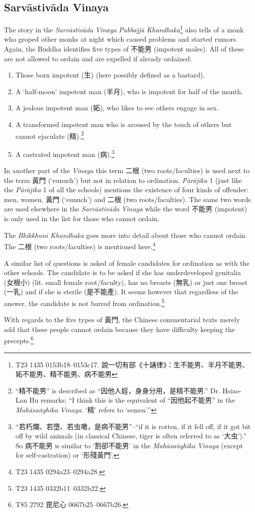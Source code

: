 \subsection{Sarvāstivāda Vinaya}
The story in the \textit{Sarvāstivāda} \textit{Vinaya} \textit{Pabbajjā Khandhaka}\footnote{T23 1435 0153b18–0153c17. 說一切有部《十誦律》：生不能男、半月不能男、妬不能男、精不能男、病不能男} also tells of a monk who groped other monks at night which caused problems and started rumors. Again, the Buddha identifies five types of 不能男 (impotent males). All of these are not allowed to ordain and are expelled if already ordained:

\begin{enumerate}
\item Those born impotent (生) (here possibly defined as a bastard).
\item A `half-moon' impotent man (半月), who is impotent for half of the month.
\item A jealous impotent man (妬), who likes to see others engage in sex.
\item A transformed impotent man who is aroused by the touch of others but cannot ejaculate (精).\footnote{``精不能男'' is described as ``因他人婬，身身分用，是精不能男.'' Dr. Hsiao-Lan Hu remarks: ``I think this is the equivalent of ``因他起不能男'' in the \textit{Mahāsaṅghika} \textit{Vinaya}. `精' refers to `semen'.''}
\item A castrated impotent man (病).\footnote{``若朽爛、若墮、若虫噉，是病不能男''--``if it is rotten, if it fell off, if it got bit off by wild animals (in classical Chinese, tiger is often referred to as `大虫').'' So 病不能男 is similar to `割卻不能男' in the \textit{Mahāsaṅghika} \textit{Vinaya} (except for self-castration) or `形殘黃門'.}
\end{enumerate}

In another part of the \textit{Vinaya} this term 二根 (two roots/faculties) is used next to the term 黃門 (`eunuch') but not in relation to ordination. \textit{Pārājika} 1 (just like the \textit{Pārājika} 1 of all the schools) mentions the existence of four kinds of offender: men, women, 黃門 (`eunuch') and 二根 (two roots/faculties). The same two words are used elsewhere in the \textit{Sarvāstivāda} \textit{Vinaya} while the word 不能男 (impotent) is only used in the list for those who cannot ordain.

The \textit{Bhikkhunī Khandhaka} goes more into detail about those who cannot ordain. The 二根 (two roots/faculties) is mentioned here.\footnote{T23 1435 0294a23–0294a28.} 

A similar list of questions is asked of female candidates for ordination as with the other schools. The candidate is to be asked if she has underdeveloped genitalia (女根小) (lit. small female root/faculty), has no breasts (無乳) or just one breast (一乳) and if she is sterile (是不能產). It seems however that regardless of the answer, the candidate is not barred from ordination.\footnote{T23 1435 0332b11–0332b22.}

With regards to the five types of 黃門, the Chinese commentarial texts merely add that these people cannot ordain because they have difficulty keeping the precepts.\footnote{T85 2792 毘尼心 0667b25–0667b26.}
